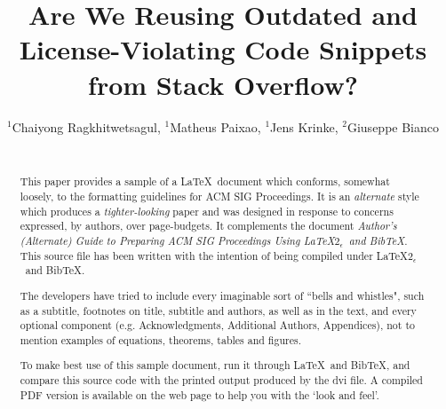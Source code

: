 \documentclass[sigconf,review, anonymous]{acmart}
\begin{document}






%

\title{Are We Reusing Outdated and License-Violating Code Snippets from Stack Overflow?}

\author{
	\alignauthor
	$^1$Chaiyong Ragkhitwetsagul, $^1$Matheus Paixao, $^1$Jens Krinke, $^2$Giuseppe Bianco \\
	\\
}


\maketitle
\begin{abstract}
This paper provides a sample of a \LaTeX\ document which conforms,
somewhat loosely, to the formatting guidelines for
ACM SIG Proceedings. It is an {\em alternate} style which produces
a {\em tighter-looking} paper and was designed in response to
concerns expressed, by authors, over page-budgets.
It complements the document \textit{Author's (Alternate) Guide to
Preparing ACM SIG Proceedings Using \LaTeX$2_\epsilon$\ and Bib\TeX}.
This source file has been written with the intention of being
compiled under \LaTeX$2_\epsilon$\ and BibTeX.

The developers have tried to include every imaginable sort
of ``bells and whistles", such as a subtitle, footnotes on
title, subtitle and authors, as well as in the text, and
every optional component (e.g. Acknowledgments, Additional
Authors, Appendices), not to mention examples of
equations, theorems, tables and figures.

To make best use of this sample document, run it through \LaTeX\
and BibTeX, and compare this source code with the printed
output produced by the dvi file. A compiled PDF version
is available on the web page to help you with the
`look and feel'.
\end{abstract}
\end{document}
